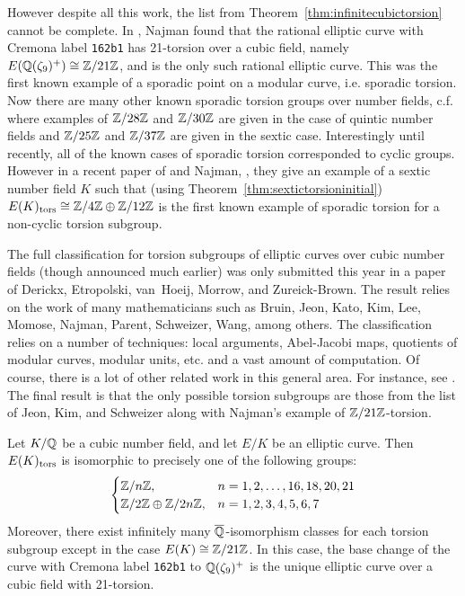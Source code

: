 However despite all this work, the list from Theorem~\ref{thm:infinitecubictorsion} cannot be complete. In \cite{najman16}, Najman found that the rational elliptic curve with Cremona label \texttt{162b1} has 21-torsion over a cubic field, namely $E(\mathbb{Q}(\zeta_9)^+) \cong \mathbb{Z}/21\mathbb{Z}$, and is the only such rational elliptic curve. This was the first known example of a sporadic point on a modular curve, i.e. sporadic torsion. Now there are many other known sporadic torsion groups over number fields, c.f. \cite{vanhoeij14} where examples of $\mathbb{Z}/28\mathbb{Z}$ and $\mathbb{Z}/30\mathbb{Z}$ are given in the case of quintic number fields and $\mathbb{Z}/25\mathbb{Z}$ and $\mathbb{Z}/37\mathbb{Z}$ are given in the sextic case. Interestingly until recently, all of the known cases of sporadic torsion corresponded to cyclic groups. However in a recent paper of \gonjim{} and Najman, \cite{gonzalezjimeneznajman20}, they give an example of a sextic number field $K$ such that (using Theorem~\ref{thm:sextictorsioninitial}) $E(K)_{\text{tors}} \cong \mathbb{Z}/4\mathbb{Z} \oplus \mathbb{Z}/12\mathbb{Z}$ is the first known example of sporadic torsion for a non-cyclic torsion subgroup.


The full classification for torsion subgroups of elliptic curves over cubic number fields (though announced much earlier) was only submitted this year in a paper of Derickx, Etropolski, van~Hoeij, Morrow, and Zureick-Brown. The result relies on the work of many mathematicians such as Bruin, Jeon, Kato, Kim, Lee, Momose, Najman, Parent, Schweizer, Wang, among others. The classification relies on a number of techniques: local arguments, Abel-Jacobi maps, quotients of modular curves, modular units, etc. and a vast amount of computation. Of course, there is a lot of other related work in this general area. For instance, see \cite{bourdongillrousewatson20}. The final result is that the only possible torsion subgroups are those from the list of Jeon, Kim, and Schweizer along with Najman's example of $\mathbb{Z}/21\mathbb{Z}$-torsion. 


\begin{thm}
Let $K/\mathbb{Q}$ be a cubic number field, and let $E/K$ be an elliptic curve. Then $E(K)_{\text{tors}}$ is isomorphic to precisely one of the following groups:
	\[
	\begin{cases}
	\mathbb{Z}/n\mathbb{Z}, & n= 1, 2, \ldots, 16, 18, 20, 21 \\
	\mathbb{Z}/2\mathbb{Z} \oplus \mathbb{Z}/2n\mathbb{Z}, & n= 1, 2, 3, 4, 5, 6, 7
	\end{cases}
	\]
Moreover, there exist infinitely many $\overline{\mathbb{Q}}$-isomorphism classes for each torsion subgroup except in the case $E(K) \cong \mathbb{Z}/21\mathbb{Z}$. In this case, the base change of the curve with Cremona label \texttt{162b1} to $\mathbb{Q}(\zeta_9)^+$ is the unique elliptic curve over a cubic field with 21-torsion. 
\end{thm}


